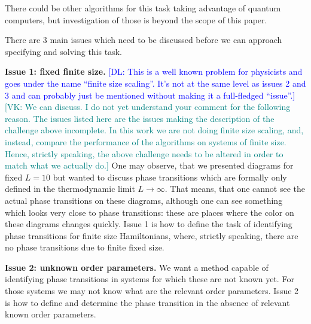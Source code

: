 \documentclass[american,aps,pra,reprint,floatfix,nofootinbib,superscriptaddress]{revtex4-2}
\newcommand{\VK}[1]{\textcolor{teal}{[VK: #1]}}
\newcommand{\DL}[1]{\textcolor{blue}{[DL: #1]}}
\begin{document}
\begin{center}
\end{center}

There could be other algorithms for this task taking advantage of
quantum computers, but investigation of those is beyond the scope of this
paper.

There are 3 main issues which need to be discussed before we can approach
specifying and solving this task.

\textbf{Issue 1: fixed finite size.}
\DL{This is a well known problem for physicists and goes under the name ``finite size scaling''. It's not at the same level as issues 2 and 3 and can probably just be mentioned without making it a full-fledged ``issue''.}
\VK{We can discuss. I do not yet understand your
comment for the following reason. The issues listed
here are the issues making the description of the
challenge above incomplete. In this work we are
not doing finite size scaling, and, instead,
compare the performance of the algorithms on
systems of finite size. Hence, strictly speaking,
the above challenge needs to be altered in order
to match what we actually do.}
One may observe, that we presented diagrams for fixed $L=10$ but wanted to
discuss phase transitions which are formally only defined in the thermodynamic
limit $L\to\infty$. That means, that one cannot see the actual phase transitions
on these diagrams, although one can see something which looks very close to
phase transitions: these are places where the color on these diagrams
changes quickly. Issue 1 is how to define the task of identifying
phase transitions for finite size Hamiltonians, where, strictly speaking,
there are no phase transitions due to finite fixed size.

\textbf{Issue 2: unknown order parameters.}
We want a method capable of identifying phase transitions in systems
for which these are not known yet. For those systems we may not know
what are the relevant order parameters. Issue 2 is how to define and
determine the phase transition in the absence of relevant known order
parameters.
\end{document}
